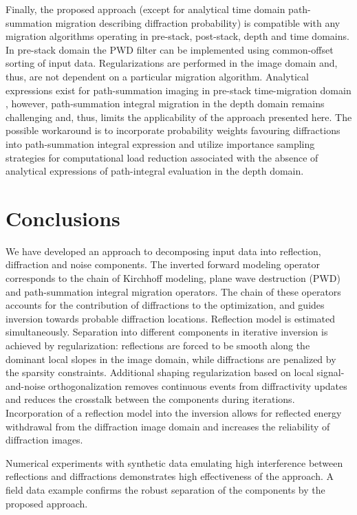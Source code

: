 Finally, the proposed approach (except for analytical time domain path-summation migration describing diffraction probability)
is compatible with any migration algorithms operating in pre-stack, post-stack, depth and time domains.
In pre-stack domain the PWD filter can be implemented using common-offset sorting of input data.
Regularizations are performed in the image domain and, thus, are not
dependent on a particular migration algorithm.
Analytical expressions exist for path-summation imaging in pre-stack
time-migration domain \cite[]{merzlikin17}, however, path-summation integral migration in the depth domain remains challenging \cite[]{landa06} and, thus, limits the applicability of the approach presented here. The possible workaround is to incorporate probability weights favouring diffractions \cite[]{merzlikin2017dps} into path-summation integral expression and utilize importance sampling strategies for computational load reduction associated with the absence of analytical expressions of path-integral evaluation in the depth domain. 

\section{Conclusions}

We have developed an approach to decomposing input data into reflection, diffraction and noise components. The inverted forward modeling operator corresponds
to the chain of Kirchhoff modeling, plane wave destruction (PWD) and path-summation integral migration operators. The chain of these operators
accounts for the contribution of diffractions to the optimization, and
guides inversion towards probable diffraction locations. Reflection model is estimated simultaneously.
Separation into different components in iterative inversion is achieved
by regularization: reflections are forced to be smooth along the dominant local slopes in the image domain, while diffractions are penalized by the sparsity constraints. 
Additional shaping regularization based on local signal-and-noise orthogonalization removes continuous events from diffractivity updates
and reduces the crosstalk between the components during
iterations.
Incorporation of a reflection model into the inversion
allows for reflected energy withdrawal from the diffraction image domain and
increases the reliability of diffraction images.

Numerical experiments with synthetic data emulating high interference between reflections and diffractions demonstrates high effectiveness of the approach.
A field data example confirms 
the robust separation of the components by the proposed approach. 

